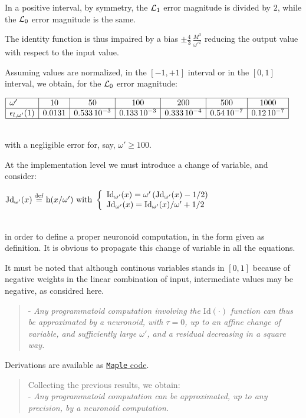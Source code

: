\documentclass[a4]{article} \usepackage[left=2cm,right=3cm,top=1cm,bottom=2cm]{geometry}
\newcommand{\eqline}[1]{~\vspace{0.1cm}\\\centerline{$#1$}\vspace{0.1cm}\\}
\newcommand{\defq}{\stackrel {\rm def}{=}}
\begin{document}
In a positive interval, by symmetry, the ${\cal L}_1$ error magnitude is divided by $2$, while the ${\cal L}_0$ error magnitude is the same.

The identity function is thus impaired by a bias $\pm \frac{4}{3} \, \frac{M^3}{\omega'^2}$ reducing the output value with respect to the input value.

Assuming values are normalized, in the $[-1, +1]$ interval or in the $[0, 1]$ interval, we obtain, for the ${\cal L}_0$ error magnitude:
\eqline{\begin{array}{|l|c|c|c|c|c|c|} \hline
\omega' & 10 & 50 & 100 & 200 & 500 & 1000  \\ \hline
\epsilon_{l,\omega'}(1) & 0.0131 &  0.533 \, 10^{-3} &  0.133 \, 10^{-3} &  0.333 \, 10^{-4} &  0.54\, 10^{-7} &  0.12\, 10^{-7}  \\ \hline
\end{array}}
with a negligible error for, say, $\omega'  \ge 100$.

At the implementation level we must introduce a change of variable, and consider:
\eqline{\mbox{Jd}_{\omega'}(x)  \defq \mbox{h}(x/\omega') \\ \mbox{ with } \left\{\begin{array}{l} \mbox{Id}_{\omega'}(x) = \omega' \, (\mbox{Jd}_{\omega'}(x) - 1/2) \\ \mbox{Jd}_{\omega'}(x) = \mbox{Id}_{\omega'}(x) / \omega' + 1/2 \\ \end{array} \right.}
in order to define a proper neuronoid computation, in the form given as definition. It is obvious to propagate this change of variable in all the equations.

It must be noted that although continous variables stands in $[0, 1]$ because of negative weights in the linear combination of input, intermediate values may be negative, as considred here.

\begin{quotation}
- {\em Any programmatoid  computation involving the $\mbox{Id}(\cdot)$ function can thus be approximated by a neuronoid, with $\tau = 0$, up to an affine change of variable, and sufficiently large $\omega'$, and a residual decreasing in a square way.}
\end{quotation}
  
Derivations are available as \href{https://raw.githubusercontent.com/vthierry/braincraft/master/doc/tex/linearapproximation.mpl.out.txt}{{\tt Maple} code}.

\begin{quotation}
Collecting the previous results, we obtain:\\
- {\em Any programmatoid computation can be approximated, up to any precision, by a neuronoid computation.}
\end{quotation}
\end{document}
